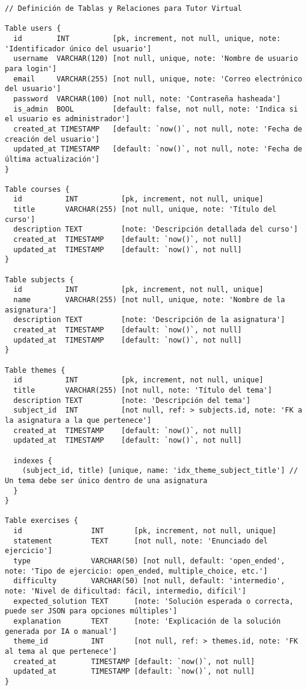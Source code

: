 \begin{lstlisting}[style=dbmlappendixstyle,
  caption={Modelo Entidad-Relación completo del sistema Tutor Virtual en formato DBML.},
  label={lst:apx_dbml_completo_contenido}
]
// Definición de Tablas y Relaciones para Tutor Virtual

Table users {
  id        INT          [pk, increment, not null, unique, note: 'Identificador único del usuario']
  username  VARCHAR(120) [not null, unique, note: 'Nombre de usuario para login']
  email     VARCHAR(255) [not null, unique, note: 'Correo electrónico del usuario']
  password  VARCHAR(100) [not null, note: 'Contraseña hasheada']
  is_admin  BOOL         [default: false, not null, note: 'Indica si el usuario es administrador']
  created_at TIMESTAMP   [default: `now()`, not null, note: 'Fecha de creación del usuario']
  updated_at TIMESTAMP   [default: `now()`, not null, note: 'Fecha de última actualización']
}

Table courses {
  id          INT          [pk, increment, not null, unique]
  title       VARCHAR(255) [not null, unique, note: 'Título del curso']
  description TEXT         [note: 'Descripción detallada del curso']
  created_at  TIMESTAMP    [default: `now()`, not null]
  updated_at  TIMESTAMP    [default: `now()`, not null]
}

Table subjects {
  id          INT          [pk, increment, not null, unique]
  name        VARCHAR(255) [not null, unique, note: 'Nombre de la asignatura']
  description TEXT         [note: 'Descripción de la asignatura']
  created_at  TIMESTAMP    [default: `now()`, not null]
  updated_at  TIMESTAMP    [default: `now()`, not null]
}

Table themes {
  id          INT          [pk, increment, not null, unique]
  title       VARCHAR(255) [not null, note: 'Título del tema']
  description TEXT         [note: 'Descripción del tema']
  subject_id  INT          [not null, ref: > subjects.id, note: 'FK a la asignatura a la que pertenece']
  created_at  TIMESTAMP    [default: `now()`, not null]
  updated_at  TIMESTAMP    [default: `now()`, not null]
  
  indexes {
    (subject_id, title) [unique, name: 'idx_theme_subject_title'] // Un tema debe ser único dentro de una asignatura
  }
}

Table exercises {
  id                INT       [pk, increment, not null, unique]
  statement         TEXT      [not null, note: 'Enunciado del ejercicio']
  type              VARCHAR(50) [not null, default: 'open_ended', note: 'Tipo de ejercicio: open_ended, multiple_choice, etc.']
  difficulty        VARCHAR(50) [not null, default: 'intermedio', note: 'Nivel de dificultad: fácil, intermedio, difícil']
  expected_solution TEXT      [note: 'Solución esperada o correcta, puede ser JSON para opciones múltiples']
  explanation       TEXT      [note: 'Explicación de la solución generada por IA o manual']
  theme_id          INT       [not null, ref: > themes.id, note: 'FK al tema al que pertenece']
  created_at        TIMESTAMP [default: `now()`, not null]
  updated_at        TIMESTAMP [default: `now()`, not null]
}


\end{lstlisting}
